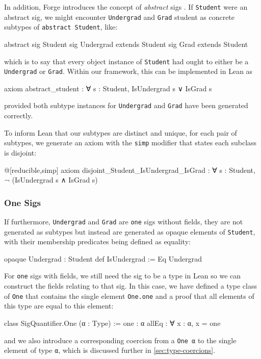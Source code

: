 In addition, Forge introduces the concept of \emph{abstract} sigs \cite{jackson2012software}. If \texttt{Student} were an abstract sig, we might encounter \texttt{Undergrad} and \texttt{Grad} student as concrete subtypes of \texttt{abstract Student}, like:
\begin{forge*}
abstract sig Student {}
sig Undergrad extends Student {}
sig Grad extends Student {}
\end{forge*}
which is to say that every object instance of \texttt{Student} had ought to either be a \texttt{Undergrad} or \texttt{Grad}. Within our framework, this can be implemented in Lean as
\begin{lean*}
axiom abstract_student : ∀ s : Student, IsUndergrad s ∨ IsGrad s
\end{lean*}
provided both subtype instances for \texttt{Undergrad} and \texttt{Grad} have been generated correctly. 

To inform Lean that our subtypes are distinct and unique, for each pair of subtypes, we generate an axiom with the \texttt{simp} modifier that states each subclass is disjoint: 
\begin{lean*}
@[reducible,simp] axiom disjoint_Student_IsUndergrad_IsGrad : 
  ∀ s : Student, ¬ (IsUndergrad s ∧ IsGrad s)
\end{lean*}

\subsubsection{One Sigs}

If furthermore, \texttt{Undergrad} and \texttt{Grad} are \texttt{one} sigs without fields, they are not generated as subtypes but instead are generated as opaque elements of \texttt{Student}, with their membership predicates being defined as equality: 
\begin{lean*}
opaque Undergrad : Student
def IsUndergrad := Eq Undergrad
\end{lean*}

For \texttt{one} sigs with fields, we still need the sig to be a type in Lean so we can construct the fields relating to that sig. In this case, we have defined a type class of \texttt{One} that contains the single element \texttt{One.one} and a proof that all elements of this type are equal to this element: 
\begin{leanimpl*}
class SigQuantifier.One (α : Type) :=
  one : α
  allEq : ∀ x : α, x = one
\end{leanimpl*}
and we also introduce a corresponding coercion from a \texttt{One α} to the single element of type \texttt{α}, which is discussed further in \cref{sec:type-coercions}.
